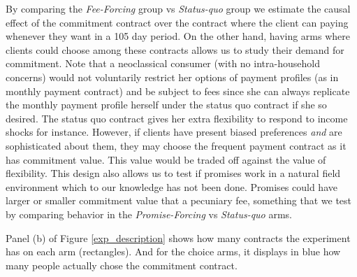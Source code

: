 \documentclass[11pt]{article}
\begin{document}
By comparing the \textit{Fee-Forcing} group vs \textit{Status-quo} group we estimate the causal effect of the commitment contract over the contract where the client can paying whenever they want in a 105 day period. On the other hand, having arms where clients could choose among these contracts allows us to study their demand for commitment. Note that a neoclassical consumer (with no intra-household concerns) would not voluntarily restrict her options of payment profiles (as in monthly payment contract) and be subject to fees since she can always replicate the monthly payment profile herself under the status quo contract if she so desired. The status quo contract gives her extra flexibility to respond to income shocks for instance. However, if clients have present biased preferences \textit{and} are sophisticated about them, they may choose the frequent payment contract as it has commitment value. This value would be traded off against the value of flexibility. This design also allows us to test if promises work in a natural field environment which to our knowledge has not been done. Promises could have larger or smaller commitment value that a pecuniary fee, something that we test by comparing behavior in the \textit{Promise-Forcing}  vs \textit{Status-quo} arms. 

Panel (b) of Figure \ref{exp_description} shows how many contracts the experiment has on each arm (rectangles). And for the choice arms, it displays in blue how many people actually chose the commitment contract.

    
\end{document}
